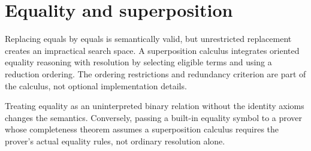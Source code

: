 \section{Equality and superposition}
\label{sec:automated-reasoning-05}

Replacing equals by equals is semantically valid, but unrestricted replacement
creates an impractical search space.  A superposition calculus integrates
oriented equality reasoning with resolution by selecting eligible terms and
using a reduction ordering.  The ordering restrictions and redundancy
criterion are part of the calculus, not optional implementation details.

\begin{warning}
Treating equality as an uninterpreted binary relation without the identity
axioms changes the semantics.  Conversely, passing a built-in equality symbol
to a prover whose completeness theorem assumes a superposition calculus
requires the prover's actual equality rules, not ordinary resolution alone.
\end{warning}


